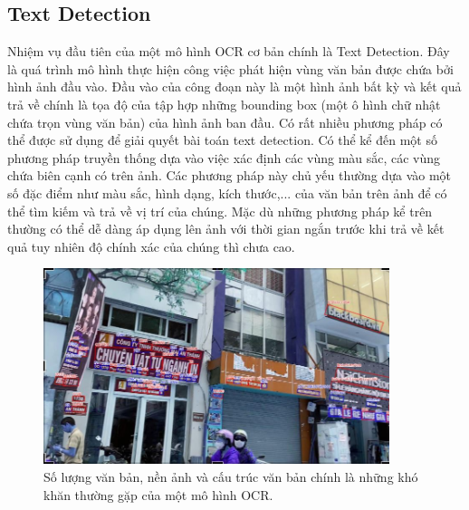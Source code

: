 \subsection{Text Detection}
Nhiệm vụ đầu tiên của một mô hình OCR cơ bản chính là Text Detection. Đây là quá trình
mô hình thực hiện công việc phát hiện vùng văn bản được chứa bởi hình ảnh đầu vào. Đầu
vào của công đoạn này là một hình ảnh bất kỳ và kết quả trả về chính là tọa độ của tập hợp
những bounding box (một ô hình chữ nhật chứa trọn vùng văn bản) của hình ảnh ban đầu.
Có rất nhiều phương pháp có thể được sử dụng để giải quyết bài toán text detection. Có thể
kể đến một số phương pháp truyền thống dựa vào việc xác định các vùng màu sắc, các
vùng chứa biên cạnh có trên ảnh. Các phương pháp này chủ yếu thường dựa vào một số
đặc điểm như màu sắc, hình dạng, kích thước,... của văn bản trên ảnh để có thể tìm kiếm
và trả về vị trí của chúng. Mặc dù những phương pháp kể trên thường có thể dễ dàng áp
dụng lên ảnh với thời gian ngắn trước khi trả về kết quả tuy nhiên độ chính xác của chúng
thì chưa cao.

\begin{figure}
\centering
\includegraphics[width=0.9\textwidth]{mep_img/Capture.JPG}
\caption{Số lượng văn bản, nền ảnh và cấu trúc văn bản chính là những khó khăn thường gặp của một mô hình OCR.}\label{fig_2.3}
\end{figure}

